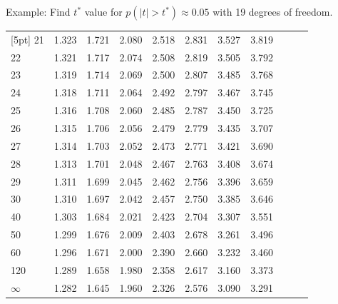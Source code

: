 \begin{frame}{\small Example: Find $t^*$ value for $p(|t|>t^*)
\approx 0.05$ with 19 degrees of freedom.}
{\begin{tabular}{l|llllllllll}
[5pt]
21 & 1.323 & 1.721 & 2.080 & 2.518 & 2.831 & 3.527 & 3.819 \\ 
22 & 1.321 & 1.717 & 2.074 & 2.508 & 2.819 & 3.505 & 3.792 \\ 
23 & 1.319 & 1.714 & 2.069 & 2.500 & 2.807 & 3.485 & 3.768 \\ 
24 & 1.318 & 1.711 & 2.064 & 2.492 & 2.797 & 3.467 & 3.745 \\ 
25 & 1.316 & 1.708 & 2.060 & 2.485 & 2.787 & 3.450 & 3.725 \\ 
[5pt]
26 & 1.315 & 1.706 & 2.056 & 2.479 & 2.779 & 3.435 & 3.707 \\ 
27 & 1.314 & 1.703 & 2.052 & 2.473 & 2.771 & 3.421 & 3.690 \\ 
28 & 1.313 & 1.701 & 2.048 & 2.467 & 2.763 & 3.408 & 3.674 \\ 
29 & 1.311 & 1.699 & 2.045 & 2.462 & 2.756 & 3.396 & 3.659 \\ 
30 & 1.310 & 1.697 & 2.042 & 2.457 & 2.750 & 3.385 & 3.646 \\ 
[5pt]
40 & 1.303 & 1.684 & 2.021 & 2.423 & 2.704 & 3.307 & 3.551 \\ 
50 & 1.299 & 1.676 & 2.009 & 2.403 & 2.678 & 3.261 & 3.496 \\ 
60 & 1.296 & 1.671 & 2.000 & 2.390 & 2.660 & 3.232 & 3.460 \\ 
120 & 1.289 & 1.658 & 1.980 & 2.358 & 2.617 & 3.160 & 3.373 \\ 
$\infty$ & 1.282 & 1.645 & 1.960 & 2.326 & 2.576 & 3.090 & 3.291 
\end{tabular}


}



\end{frame}

